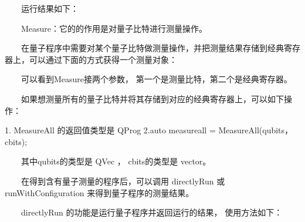 \documentclass[a4paper,11pt,english]{sphinxmanual}
\begin{document}
\sphinxAtStartPar
  运行结果如下：

\begin{sphinxVerbatim}[commandchars=\\\{\}]
  
  
  
  
\end{sphinxVerbatim}

\sphinxAtStartPar
  Measure：它的的作用是对量子比特进行测量操作。

\sphinxAtStartPar
  在量子程序中需要对某个量子比特做测量操作，并把测量结果存储到经典寄存器上，可以通过下面的方式获得一个测量对象：

\begin{sphinxVerbatim}[commandchars=\\\{\}]
    
\end{sphinxVerbatim}

\sphinxAtStartPar
  可以看到Measure接两个参数， 第一个是测量比特，第二个是经典寄存器。

\sphinxAtStartPar
  如果想测量所有的量子比特并将其存储到对应的经典寄存器上，可以如下操作：

\begin{sphinxVerbatim}[commandchars=\\\{\}]
1.\PYGZsh{} MeasureAll 的返回值类型是 QProg
2.auto measure\PYGZus{}all = MeasureAll(qubits， cbits);
\end{sphinxVerbatim}

\sphinxAtStartPar
  其中qubits的类型是 QVec ， cbits的类型是 vector。

\sphinxAtStartPar
  在得到含有量子测量的程序后，可以调用 directlyRun 或 runWithConfiguration 来得到量子程序的测量结果。

\sphinxAtStartPar
  directlyRun 的功能是运行量子程序并返回运行的结果， 使用方法如下：
\end{document}
